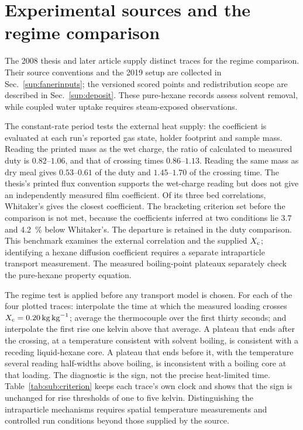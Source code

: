 \documentclass[11pt]{article}
\begin{document}


\section{Experimental sources and the regime comparison}
\label{sup:validationdetail}\label{sup:datasetversions}\label{sup:tworegimes}\label{sup:filmmatch}\label{sup:moved:prereg}
The 2008 thesis \citep{faner2008desolventizado} and later article
\citep{faner2019kinetics} supply distinct traces for the regime comparison.
Their source conventions and the 2019 setup are collected in
Sec.~\ref{sup:fanerinputs}; the versioned scored points and redistribution
scope are described in Sec.~\ref{sup:deposit}. These pure-hexane records
assess solvent removal, while coupled water uptake requires steam-exposed
observations.

The constant-rate period tests the external heat supply: the coefficient is evaluated at each run's reported gas state, holder footprint and sample mass. Reading the printed mass as the wet charge, the ratio of calculated to measured duty is $0.82$--$1.06$, and that of crossing times $0.86$--$1.13$. Reading the same mass as dry meal gives $0.53$--$0.61$ of the duty and $1.45$--$1.70$ of the crossing time. The thesis's printed flux convention supports the wet-charge reading but does not give an independently measured film coefficient. Of its three bed correlations, Whitaker's gives the closest coefficient. The bracketing criterion set before the comparison is not met, because the coefficients inferred at two conditions lie $3.7$ and \SI{4.2}{\percent} below Whitaker's. The departure is retained in the duty comparison. This benchmark examines the external correlation and the supplied $X_{\mathrm{c}}$; identifying a hexane diffusion coefficient requires a separate intraparticle transport measurement. The measured boiling-point plateaux separately check the pure-hexane property equation.

The regime test is applied before any transport model is chosen. For each of the four plotted traces: interpolate the time at which the measured loading crosses $X_{\mathrm{c}}=\SI{0.20}{\kilogram\per\kilogram}$; average the thermocouple over the first thirty seconds; and interpolate the first rise one kelvin above that average. A plateau that ends after the crossing, at a temperature consistent with solvent boiling, is consistent with a receding liquid-hexane core. A plateau that ends before it, with the temperature several reading half-widths above boiling, is inconsistent with a boiling core at that loading. The diagnostic is the sign, not the precise heat-limited time. Table~\ref{tab:sub:criterion} keeps each trace's own clock and shows that the sign is unchanged for rise thresholds of one to five kelvin. Distinguishing the intraparticle mechanisms requires spatial temperature measurements and controlled run conditions beyond those supplied by the source.
\end{document}
